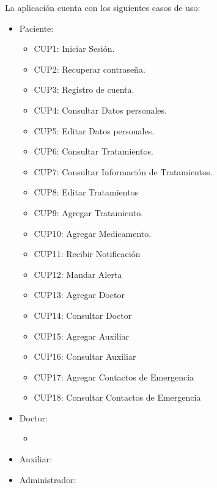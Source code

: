 La aplicación cuenta con los siguientes casos de uso:
\begin{itemize}
	\item Paciente:
		\begin{itemize}
			\item CUP1: Iniciar Sesión.
			\item CUP2: Recuperar contraseña.
			\item CUP3: Registro de cuenta.
			\item CUP4: Consultar Datos personales.
			\item CUP5: Editar Datos personales.
			\item CUP6: Consultar Tratamientos.
			\item CUP7: Consultar Información de Tratamientos.
			\item CUP8: Editar Tratamientos
			\item CUP9: Agregar Tratamiento.
			\item CUP10: Agregar Medicamento.
			\item CUP11: Recibir Notificación
			\item CUP12: Mandar Alerta
			\item CUP13: Agregar Doctor
			\item CUP14: Consultar Doctor
			\item CUP15: Agregar Auxiliar
			\item CUP16: Consultar Auxiliar
			\item CUP17: Agregar Contactos de Emergencia
			\item CUP18: Consultar Contactos de Emergencia
		\end{itemize}
	\item Doctor:
		\begin{itemize}
			\item 
		\end{itemize}
	\item Auxiliar:
	\item Administrador:
\end{itemize}
%	
